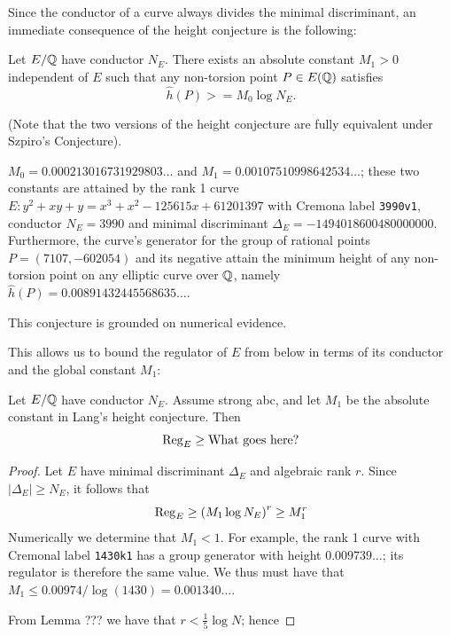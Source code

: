 \documentclass[10pt]{article}
\begin{document}
Since the conductor of a curve always divides the minimal discriminant, an immediate consequence of the height conjecture is the following:
\begin{corollary}
Let $E/\mathbb{Q}$ have conductor $N_E$. There exists an absolute constant $M_1 >0$ independent of $E$ such that any non-torsion point $P \in E(\mathbb{Q})$ satisfies
\begin{equation}
\hat{h}(P) >= M_0 \log N_E .
\end{equation}
\end{corollary}
(Note that the two versions of the height conjecture are fully equivalent under Szpiro's Conjecture). \\

\begin{conjecture}
$M_0 = 0.000213016731929803\ldots$ and $M_1 = 0.00107510998642534\ldots$; these two constants are attained by the rank 1 curve $E: y^2+xy+y=x^3+x^2-125615x+61201397$ with Cremona label {\tt 3990v1}, conductor $N_E = 3990$ and minimal discriminant $\Delta_E = -1494018600480000000$. Furthermore, the curve's generator for the group of rational points $P = (7107,-602054)$ and its negative attain the minimum height of any non-torsion point on any elliptic curve over $\mathbb{Q}$, namely $\hat{h}(P) = 0.00891432445568635\ldots$.
\end{conjecture}
This conjecture is grounded on numerical evidence. 

This allows us to bound the regulator of $E$ from below in terms of its conductor and the global constant $M_1$:
\begin{theorem}
Let $E/\mathbb{Q}$ have conductor $N_E$. Assume strong abc, and let $M_1$ be the absolute constant in Lang's height conjecture. Then
\begin{equation}
\operatorname{Reg}_E \ge \text{What goes here?}
\end{equation}
\end{theorem}
\begin{proof}
Let $E$ have minimal discriminant $\Delta_E$ and algebraic rank $r$. Since $|\Delta_E|\ge N_E$, it follows that 
\begin{equation*}
\operatorname{Reg}_E \ge \left(M_1 \log N_E \right)^r \ge M_1^r
\end{equation*}
Numerically we determine that $M_1 < 1$. For example, the rank 1 curve with Cremonal label {\tt 1430k1} has a group generator with height $0.009739\ldots$; its regulator is therefore the same value. We thus must have that $M_1 \le 0.00974/\log(1430) = 0.001340\ldots$.

From Lemma ??? we have that $r < \frac{1}{5}\log N$; hence 

\end{proof}









{}

\end{document}
